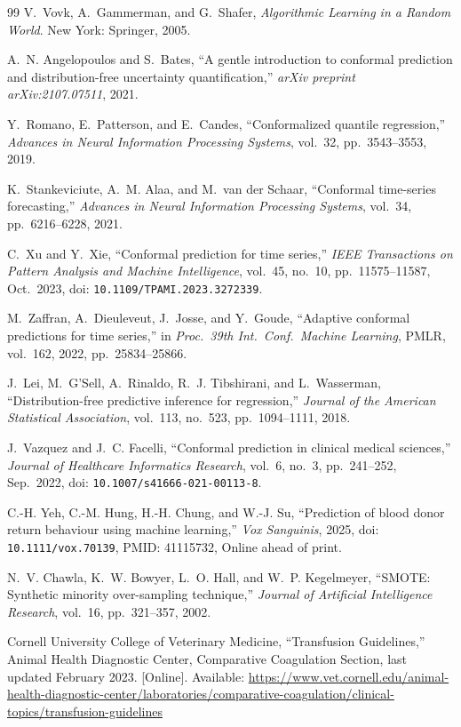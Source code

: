 \documentclass[12pt,a4paper]{article}
\begin{document}
\begin{thebibliography}{99}
V.~Vovk, A.~Gammerman, and G.~Shafer,
\textit{Algorithmic Learning in a Random World}.
New York: Springer, 2005.

A.~N. Angelopoulos and S.~Bates,
``A gentle introduction to conformal prediction and distribution-free
uncertainty quantification,''
\textit{arXiv preprint arXiv:2107.07511}, 2021.

Y.~Romano, E.~Patterson, and E.~Candes,
``Conformalized quantile regression,''
\textit{Advances in Neural Information Processing Systems},
vol.~32, pp.~3543--3553, 2019.

K.~Stankeviciute, A.~M. Alaa, and M.~van der Schaar,
``Conformal time-series forecasting,''
\textit{Advances in Neural Information Processing Systems},
vol.~34, pp.~6216--6228, 2021.

C.~Xu and Y.~Xie,
``Conformal prediction for time series,''
\textit{IEEE Transactions on Pattern Analysis and Machine Intelligence},
vol.~45, no.~10, pp.~11575--11587, Oct.\ 2023,
doi: \texttt{10.1109/TPAMI.2023.3272339}.

M.~Zaffran, A.~Dieuleveut, J.~Josse, and Y.~Goude,
``Adaptive conformal predictions for time series,''
in \textit{Proc.\ 39th Int.\ Conf.\ Machine Learning},
PMLR, vol.~162, 2022, pp.~25834--25866.

J.~Lei, M.~G'Sell, A.~Rinaldo, R.~J. Tibshirani, and L.~Wasserman,
``Distribution-free predictive inference for regression,''
\textit{Journal of the American Statistical Association},
vol.~113, no.~523, pp.~1094--1111, 2018.

J.~Vazquez and J.~C. Facelli,
``Conformal prediction in clinical medical sciences,''
\textit{Journal of Healthcare Informatics Research},
vol.~6, no.~3, pp.~241--252, Sep.\ 2022,
doi: \texttt{10.1007/s41666-021-00113-8}.

C.-H. Yeh, C.-M. Hung, H.-H. Chung, and W.-J. Su,
``Prediction of blood donor return behaviour using machine learning,''
\textit{Vox Sanguinis}, 2025,
doi: \texttt{10.1111/vox.70139},
PMID: 41115732, Online ahead of print.

N.~V. Chawla, K.~W. Bowyer, L.~O. Hall, and W.~P. Kegelmeyer,
``SMOTE: Synthetic minority over-sampling technique,''
\textit{Journal of Artificial Intelligence Research},
vol.~16, pp.~321--357, 2002.

Cornell University College of Veterinary Medicine,
``Transfusion Guidelines,''
Animal Health Diagnostic Center, Comparative Coagulation Section,
last updated February 2023. [Online]. Available:
\url{https://www.vet.cornell.edu/animal-health-diagnostic-center/laboratories/comparative-coagulation/clinical-topics/transfusion-guidelines}


\end{thebibliography}
\end{document}
